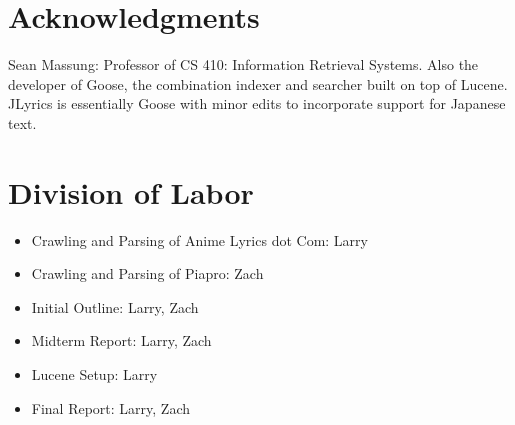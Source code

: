 \documentclass{acm} %
\begin{document}
\begin{CJK}{UTF8}{zhsong}
\section*{Acknowledgments}

Sean Massung: Professor of CS 410: Information Retrieval Systems. Also the developer of Goose, the combination indexer and searcher built on top of Lucene. JLyrics is essentially Goose with minor edits to incorporate support for Japanese text.

\appendix

\section{Division of Labor}

\begin{itemize}
\item Crawling and Parsing of Anime Lyrics dot Com: Larry
\item Crawling and Parsing of Piapro: Zach
\item Initial Outline: Larry, Zach
\item Midterm Report: Larry, Zach
\item Lucene Setup: Larry
\item Final Report: Larry, Zach
\end{itemize}

%

\end{CJK}
\end{document}
